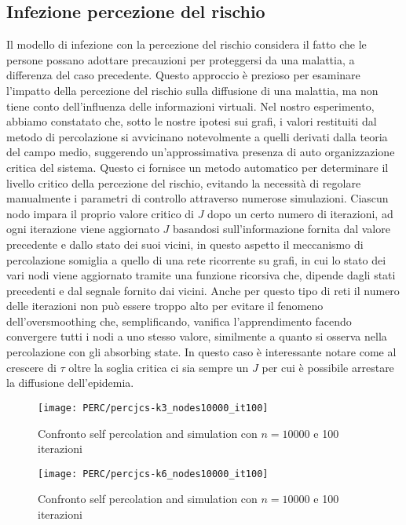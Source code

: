 \subsection{Infezione percezione del rischio}\label{subsec:res-infezione-con-la-percezione-del-rischio}
    Il modello di infezione con la percezione del rischio considera il fatto che le persone possano adottare precauzioni
    per proteggersi da una malattia, a differenza del caso precedente.
    Questo approccio è prezioso per esaminare l'impatto della percezione del rischio sulla diffusione di una malattia,
    ma non tiene conto dell'influenza delle informazioni virtuali.
    Nel nostro esperimento, abbiamo constatato che, sotto le nostre ipotesi sui grafi, i valori restituiti dal metodo di
    percolazione si avvicinano notevolmente a quelli derivati dalla teoria del campo medio, suggerendo un'approssimativa
    presenza di auto organizzazione critica del sistema.
    Questo ci fornisce un metodo automatico per determinare il livello critico della percezione del rischio, evitando la
    necessità di regolare manualmente i parametri di controllo attraverso numerose simulazioni.
    Ciascun nodo impara il proprio valore critico di $J$ dopo un certo numero di iterazioni, ad ogni iterazione
    viene aggiornato $J$ basandosi sull'informazione fornita dal valore precedente e dallo stato dei suoi vicini, in
    questo aspetto il meccanismo di percolazione somiglia a quello di una rete ricorrente su grafi, in cui lo stato dei
    vari nodi viene aggiornato tramite una funzione ricorsiva che, dipende dagli stati precedenti e dal segnale fornito dai
    vicini.
    Anche per questo tipo di reti il numero delle iterazioni non può essere troppo alto per evitare il fenomeno
    dell'oversmoothing che, semplificando, vanifica l'apprendimento facendo convergere tutti i nodi a uno stesso valore,
    similmente a quanto si osserva nella percolazione con gli absorbing state.
    In questo caso è interessante notare come al crescere di $\tau$ oltre la soglia critica ci sia sempre un $J$ per cui è
    possibile arrestare la diffusione dell'epidemia.

    \begin{figure}[H]
        \texttt{[image: PERC/percjcs-k3\_nodes10000\_it100]}
        \caption{Confronto self percolation and simulation con $n=10000$ e 100 iterazioni}
        \label{fig:perc_jcs_k_3}
    \end{figure}

    \begin{figure}[H]
        \texttt{[image: PERC/percjcs-k6\_nodes10000\_it100]}
        \caption{Confronto self percolation and simulation con $n=10000$ e 100 iterazioni}
        \label{fig:perc_jcs_k_6}
    \end{figure}

